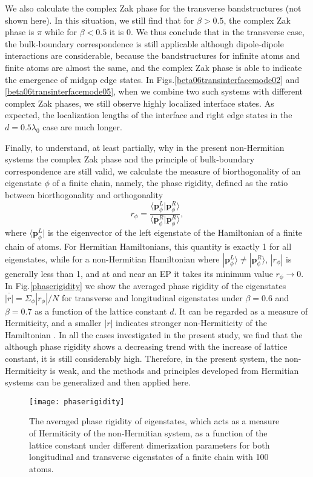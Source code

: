\documentclass[aps,pra,reprint,groupedaddress,nofootinbib,longbibliography,showpacs]{revtex4-1}
\begin{document}
We also calculate the complex Zak phase for the transverse bandstructures (not shown here). In this situation, we still find that for $\beta>0.5$, the complex Zak phase is $\pi$ while for $\beta<0.5$ it is $0$. We thus conclude that in the transverse case, the bulk-boundary correspondence is still applicable although dipole-dipole interactions are considerable, because the bandstructures for infinite atoms and finite atoms are almost the same, and the complex Zak phase is able to indicate the emergence of midgap edge states. In Figs.\ref{beta06transinterfacemode02} and \ref{beta06transinterfacemode05}, when we combine two such systems with different complex Zak phases, we still observe highly localized interface states. As expected, the localization lengths of the interface and right edge states in the $d=0.5\lambda_0$ case are much longer.

Finally, to understand, at least partially, why in the present non-Hermitian systems the complex Zak phase and the principle of bulk-boundary correspondence are still valid, we calculate the measure of biorthogonality of an eigenstate $\phi$ of a finite chain, namely, the phase rigidity, defined as the ratio between biorthogonality and orthogonality \cite{alvarezPRB2018,eleuchPRA2016}
\begin{equation}
r_\phi=\frac{\langle \mathbf{p}_\phi^L|\mathbf{p}_\phi^R\rangle}{\langle \mathbf{p}_\phi^R|\mathbf{p}_\phi^R\rangle},
\end{equation}
where $\langle\mathbf{p}_\phi^L|$ is the eigenvector of the left eigenstate of the Hamiltonian of a finite chain of atoms. For Hermitian Hamiltonians, this quantity is exactly 1 for all eigenstates, while for a non-Hermitian Hamiltonian where $|\mathbf{p}_\phi^L\rangle\neq|\mathbf{p}_\phi^R\rangle$, $|r_\phi|$ is generally less than 1, and at and near an EP it takes its minimum value $r_\phi\rightarrow0$. In Fig.\ref{phaserigidity} we show the averaged phase rigidity of the eigenstates $\bar{|r|}=\Sigma_{\phi}|r_\phi|/N$ for transverse and longitudinal eigenstates under $\beta=0.6$ and $\beta=0.7$ as a function of the lattice constant $d$. It can be regarded as a measure of Hermiticity, and a smaller $|r|$ indicates stronger non-Hermiticity of the Hamiltonian \cite{alvarezPRB2018,eleuchPRA2016}. In all the cases investigated in the present study, we find that the although phase rigidity shows a decreasing trend with the increase of lattice constant, it is still considerably high. Therefore, in the present system, the non-Hermiticity is weak, and the methods and principles developed from Hermitian systems can be generalized and then applied here.
\begin{figure}[htbp]
	\centering
	\texttt{[image: phaserigidity]}


	\caption{The averaged phase rigidity of eigenstates, which acts as a measure of Hermiticity of the non-Hermitian system, as a function of the lattice constant under different dimerization parameters for both longitudinal and transverse eigenstates of a finite chain with 100 atoms.}\label{phaserigidity}
	
	\label{nonhermiticity}
\end{figure}
\end{document}
